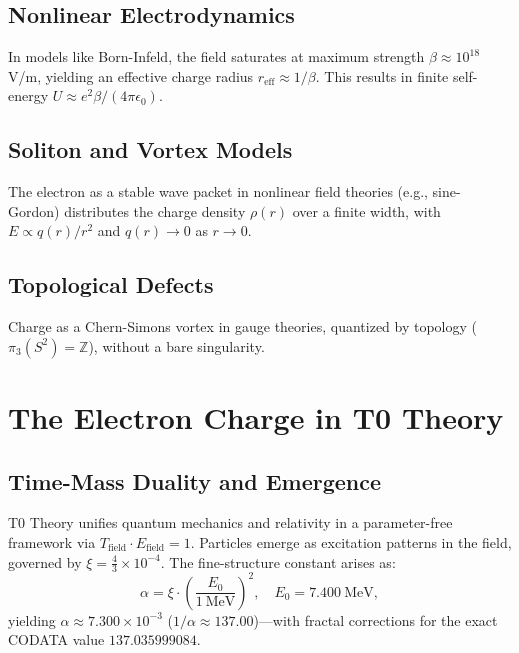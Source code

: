 	\subsection{Nonlinear Electrodynamics}
	In models like Born-Infeld, the field saturates at maximum strength $\beta \approx 10^{18}$ V/m, yielding an effective charge radius $r_{\text{eff}} \approx 1/\beta$. This results in finite self-energy $U \approx e^2 \beta / (4\pi \epsilon_0)$.
	
	\subsection{Soliton and Vortex Models}
	The electron as a stable wave packet in nonlinear field theories (e.g., sine-Gordon) distributes the charge density $\rho(r)$ over a finite width, with $E \propto q(r)/r^2$ and $q(r) \to 0$ as $r \to 0$.
	
	\subsection{Topological Defects}
	Charge as a Chern-Simons vortex in gauge theories, quantized by topology ($\pi_3(S^2) = \mathbb{Z}$), without a bare singularity.
	
	\begin{table}[h]
		\centering
		\caption{Comparison of alternative charge representations}
		\label{tab:comparison}
	\end{table}
	
	\section{The Electron Charge in T0 Theory}
	\label{sec:t0-charge}
	
	\subsection{Time-Mass Duality and Emergence}
	T0 Theory unifies quantum mechanics and relativity in a parameter-free framework via $T_{\text{field}} \cdot E_{\text{field}} = 1$. Particles emerge as excitation patterns in the field, governed by $\xi = \frac{4}{3} \times 10^{-4}$. The fine-structure constant arises as:
	\begin{equation}
		\alpha = \xi \cdot \left( \frac{E_0}{1~\mathrm{MeV}} \right)^2, \quad E_0 = 7.400~\mathrm{MeV},
	\end{equation}
	yielding $\alpha \approx 7.300 \times 10^{-3}$ ($1/\alpha \approx 137.00$)—with fractal corrections for the exact CODATA value $137.035999084$.
	
